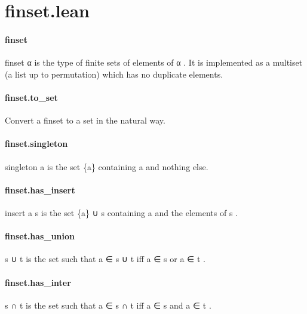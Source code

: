 \documentclass{article}
\begin{document}
\section{finset.lean}\paragraph{finset}
\par
\colorbox[RGB]{253,246,227}{{{{\color[RGB]{101, 123, 131} finset α }}}} is the type of finite sets of elements of 
\colorbox[RGB]{253,246,227}{{{{\color[RGB]{101, 123, 131} α }}}}. It is implemented
as a multiset (a list up to permutation) which has no duplicate elements.
\paragraph{finset.to\_set}
\par
Convert a finset to a set in the natural way.
\paragraph{finset.singleton}
\par
\colorbox[RGB]{253,246,227}{{{{\color[RGB]{101, 123, 131} singleton a }}}} is the set 
\colorbox[RGB]{253,246,227}{{{{\color[RGB]{101, 123, 131} \{a\} }}}} containing 
\colorbox[RGB]{253,246,227}{{{{\color[RGB]{101, 123, 131} a }}}} and nothing else.
\paragraph{finset.has\_insert}
\par
\colorbox[RGB]{253,246,227}{{{{\color[RGB]{101, 123, 131} insert a s }}}} is the set 
\colorbox[RGB]{253,246,227}{{{{\color[RGB]{101, 123, 131} \{a\} ∪ s }}}} containing 
\colorbox[RGB]{253,246,227}{{{{\color[RGB]{101, 123, 131} a }}}} and the elements of 
\colorbox[RGB]{253,246,227}{{{{\color[RGB]{101, 123, 131} s }}}}.
\paragraph{finset.has\_union}
\par
\colorbox[RGB]{253,246,227}{{{{\color[RGB]{101, 123, 131} s ∪ t }}}} is the set such that 
\colorbox[RGB]{253,246,227}{{{{\color[RGB]{101, 123, 131} a ∈ s ∪ t }}}} iff 
\colorbox[RGB]{253,246,227}{{{{\color[RGB]{101, 123, 131} a ∈ s }}}} or 
\colorbox[RGB]{253,246,227}{{{{\color[RGB]{101, 123, 131} a ∈ t }}}}.
\paragraph{finset.has\_inter}
\par
\colorbox[RGB]{253,246,227}{{{{\color[RGB]{101, 123, 131} s ∩ t }}}} is the set such that 
\colorbox[RGB]{253,246,227}{{{{\color[RGB]{101, 123, 131} a ∈ s ∩ t }}}} iff 
\colorbox[RGB]{253,246,227}{{{{\color[RGB]{101, 123, 131} a ∈ s }}}} and 
\colorbox[RGB]{253,246,227}{{{{\color[RGB]{101, 123, 131} a ∈ t }}}}.
\end{document}
